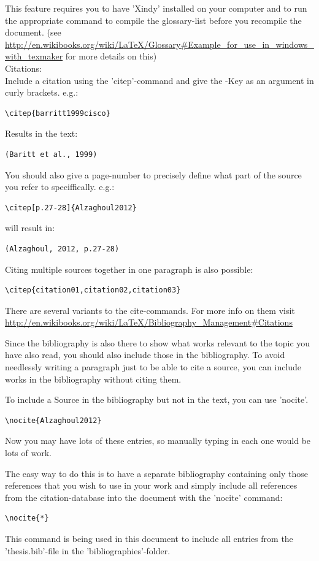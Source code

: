 \documentclass[a4paper, 12pt,oneside]{article}
\begin{document}
This feature requires you to have 'Xindy' installed on your computer and to run the appropriate command to compile the glossary-list before you recompile the document. (see \url{http://en.wikibooks.org/wiki/LaTeX/Glossary#Example_for_use_in_windows_with_texmaker} for more details on this)\\


Citations:\\

Include a citation using the 'citep'-command and give the \BibTeX-Key as an argument in curly brackets. e.g.:
\begin{verbatim}
\citep{barritt1999cisco}
\end{verbatim}
Results in the text:
\begin{verbatim}
(Baritt et al., 1999)
\end{verbatim}
You should also give a page-number to precisely define what part of the source you refer to speciffically. e.g.:
\begin{verbatim}
\citep[p.27-28]{Alzaghoul2012}
\end{verbatim}
will result in:
\begin{verbatim}
(Alzaghoul, 2012, p.27-28)
\end{verbatim}

Citing multiple sources together in one paragraph is also possible:
\begin{verbatim}
\citep{citation01,citation02,citation03}
\end{verbatim}

There are several variants to the cite-commands. For more info on them visit \url{http://en.wikibooks.org/wiki/LaTeX/Bibliography_Management#Citations}

 Since the bibliography is also there to show what works relevant to the topic you have also read, you should also include those in the bibliography. To avoid needlessly writing a paragraph just to be able to cite a source, you can include works in the bibliography without citing them.
 
 To include a Source in the bibliography but not in the text, you can use 'nocite'.
\begin{verbatim}
\nocite{Alzaghoul2012}
\end{verbatim}

Now you may have lots of these entries, so manually typing in each one would be lots of work. 

The easy way to do this is to have a separate bibliography containing only those references that you wish to use in your work and simply include all references from the citation-database into the document with the 'nocite' command:
\begin{verbatim}
\nocite{*}
\end{verbatim}
This command is being used in this document to include all entries from the 'thesis.bib'-file in the 'bibliographies'-folder. 
\end{document}
